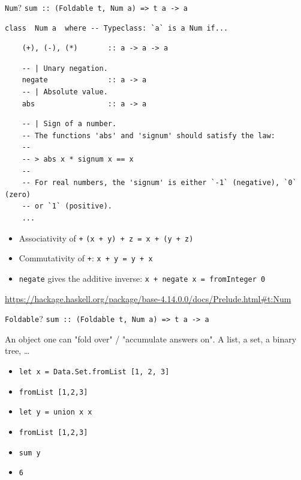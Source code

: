 \documentclass[8pt]{beamer}
\newcommand{\raw}[1]{\texttt{#1}}
\newcommand{\hs}[1]{\texttt{#1}}
\begin{document}
\begin{frame}[fragile]{\texttt{Num}?}
\hs{sum :: (Foldable t, Num a) => t a -> a}

\pause
\begin{verbatim}
class  Num a  where -- Typeclass: `a` is a Num if...
\end{verbatim}
\pause
\begin{verbatim}
    (+), (-), (*)       :: a -> a -> a
\end{verbatim}
\pause
\begin{verbatim}
    -- | Unary negation.
    negate              :: a -> a
    -- | Absolute value.
    abs                 :: a -> a
\end{verbatim}
\pause
\begin{verbatim}
    -- | Sign of a number.
    -- The functions 'abs' and 'signum' should satisfy the law:
    --
    -- > abs x * signum x == x
    --
    -- For real numbers, the 'signum' is either `-1` (negative), `0` (zero)
    -- or `1` (positive).
    ...
\end{verbatim}

\pause
\begin{itemize}
    \item Associativity of \raw{+} \raw{(x + y) + z = x + (y + z)} \pause
    \item Commutativity of \raw{+}: \raw{x + y = y + x} \pause
    \item \raw{negate} gives the additive inverse: \raw{x + negate x = fromInteger 0} \pause
\end{itemize}

\pause
\url{https://hackage.haskell.org/package/base-4.14.0.0/docs/Prelude.html#t:Num}

\end{frame}

\begin{frame}[fragile]{\texttt{Foldable}?}
\hs{sum :: (Foldable t, Num a) => t a -> a}

\pause
An object one can "fold over" / "accumulate answers on". \pause A list, a set, a binary tree, \dots

\begin{itemize}
    \item \hs{let x = Data.Set.fromList [1, 2, 3]} \pause
    \item \hs{fromList [1,2,3]} \pause
    \item \hs{let y = union x x} \pause
    \item \raw{fromList [1,2,3]} \pause
    \item \hs{sum y}
    \item \raw{6}
\end{itemize}
\end{frame}
\end{document}
